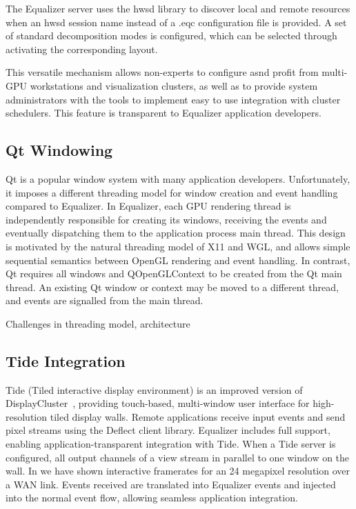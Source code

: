 \documentclass[10pt,journal,compsoc]{IEEEtran}
\begin{document}
The Equalizer server uses the hwsd library to discover local and remote
resources when an hwsd session name instead of a \textsf{.eqc} configuration
file is provided. A set of standard decomposition modes is configured, which can
be selected through activating the corresponding layout.

This versatile mechanism allows non-experts to configure asnd profit from
multi-GPU workstations and visualization clusters, as well as to provide system
administrators with the tools to implement easy to use integration with cluster
schedulers. This feature is transparent to Equalizer application developers.

\subsection{Qt Windowing}

Qt is a popular window system with many application developers. Unfortunately,
it imposes a different threading model for window creation and event handling
compared to Equalizer. In Equalizer, each GPU rendering thread is independently
responsible for creating its windows, receiving the events and eventually
dispatching them to the application process main thread. This design is
motivated by the natural threading model of X11 and WGL, and allows simple
sequential semantics between OpenGL rendering and event handling. In contrast,
Qt requires all windows and QOpenGLContext to be created from the Qt main
thread. An existing Qt window or context may be moved to a different thread, and
events are signalled from the main thread.

Challenges in threading model, architecture

\subsection{Tide Integration}

Tide (Tiled interactive display environment) is an improved version of
DisplayCluster~\cite{DC}, providing touch-based, multi-window user interface for
high-resolution tiled display walls. Remote applications receive input events
and send pixel streams using the Deflect client library. Equalizer includes full
support, enabling application-transparent integration with Tide. When a Tide
server is configured, all output channels of a view stream in parallel to one
window on the wall. In \cite{deflect} we have shown interactive framerates for
an 24 megapixel resolution over a WAN link. Events received are translated into
Equalizer events and injected into the normal event flow, allowing seamless
application integration.
\end{document}
